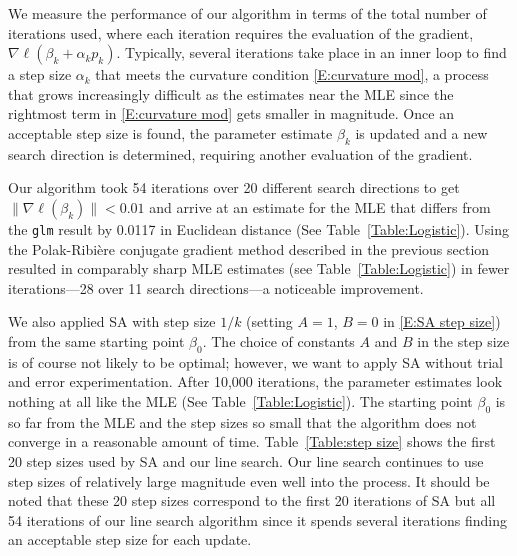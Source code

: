 \documentclass[oneside]{myumnStatThesis}
\begin{document}
We measure the performance of our algorithm in terms of the total number of iterations used, where each iteration 
requires the evaluation of the gradient, $\nabla \ell( \beta_k + \alpha_k p_k )$.  Typically, several iterations take 
place in an inner loop to find a step size $\alpha_k$ that meets the curvature condition \eqref{E:curvature mod}, a 
process that grows increasingly difficult as the estimates near the MLE since the rightmost term in \eqref{E:curvature 
mod} gets smaller in magnitude.  Once an acceptable step size is found, the parameter estimate $\beta_k$ is updated and 
a new search direction is determined, requiring another evaluation of the gradient.

Our algorithm took 54 iterations over 20 different search directions to get $\lVert \nabla \ell( \beta_k ) \rVert < 
0.01$ and arrive at an estimate for the MLE that differs from the \texttt{glm} result by 0.0117 in Euclidean distance 
(See Table~\ref{Table:Logistic}).  
Using the Polak-Ribi\`{e}re conjugate gradient method described in the previous section  resulted in comparably sharp 
MLE estimates (see Table~\ref{Table:Logistic}) in fewer iterations---28 over 11 search directions---a noticeable 
improvement. 

We also applied  SA with step size $1/k$ (setting $A=1$, $B=0$ in \eqref{E:SA step size}) from the same starting point 
$\beta_0$.  The choice of constants $A$ and $B$ in the step size is of course not likely to be optimal;
however, we want to apply SA without trial and error experimentation.  
After 10,000 iterations, the parameter estimates look nothing at all like the MLE (See Table~\ref{Table:Logistic}).  
The starting point $\beta_0$ is so far from the MLE and the step sizes so small that the algorithm does not converge in a reasonable amount of time.
Table~\ref{Table:step size} shows the first 20 step sizes used by SA and our line search. Our line search continues to 
use step sizes of relatively large magnitude even well into the process.  It should be noted that these 20 step sizes 
correspond to the first 20 iterations of SA but all 54 iterations of our line search algorithm since it spends several 
iterations finding an acceptable step size for each update.
\end{document}
